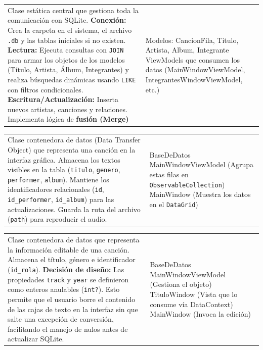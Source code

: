 \documentclass{article}
\newcommand{\tarjeta}[3]{%
      \begin{center}
      \begin{tabular}{|>{\raggedright\arraybackslash}p{7.8cm}|>{\raggedright\arraybackslash}p{4.2cm}|}
        \hline
        \multicolumn{2}{|c|}{#1} \\ \hline
        #2 & #3 \\ \hline
      \end{tabular}
      \end{center}
    }
\begin{document}
\tarjeta{BaseDatos}
{Clase estática central que gestiona toda la comunicación con SQLite.\newline
\textbf{Conexión:} Crea la carpeta en el sistema, el archivo \texttt{.db} y las tablas iniciales si no existen.\newline
\textbf{Lectura:} Ejecuta consultas con \texttt{JOIN} para armar los objetos de los modelos (Título, Artista, Álbum, Integrantes) y realiza búsquedas dinámicas usando \texttt{LIKE} con filtros condicionales.\newline
\textbf{Escritura/Actualización:} Inserta nuevos artistas, canciones y relaciones. Implementa lógica de \textbf{fusión (Merge)}
}
{Modelos: CancionFila, Titulo, Artista, Album, Integrante\newline
ViewModels que consumen los datos (MainWindowViewModel, IntegrantesWindowViewModel, etc.)
}


\tarjeta{CancionFila (Modelo de Datos / DTO)}
{Clase contenedora de datos (Data Transfer Object) que representa una canción en la interfaz gráfica.\newline
Almacena los textos visibles en la tabla (\texttt{titulo}, \texttt{genero}, \texttt{performer}, \texttt{album}).\newline
Mantiene los identificadores relacionales (\texttt{id}, \texttt{id\_performer}, \texttt{id\_album}) para las actualizaciones.\newline
Guarda la ruta del archivo (\texttt{path}) para reproducir el audio.
}
{BaseDeDatos\newline
MainWindowViewModel (Agrupa estas filas en \texttt{ObservableCollection})\newline
MainWindow (Muestra los datos en el \texttt{DataGrid})
}

\tarjeta{Titulo (Modelo de Datos / DTO)}
{Clase contenedora de datos que representa la información editable de una canción.\newline
Almacena el título, género e identificador (\texttt{id\_rola}).\newline
\textbf{Decisión de diseño:} Las propiedades \texttt{track} y \texttt{year} se definieron como enteros anulables (\texttt{int?}). Esto permite que el usuario borre el contenido de las cajas de texto en la interfaz sin que salte una excepción de conversión, facilitando el manejo de nulos antes de actualizar SQLite.
}
{BaseDeDatos\newline
MainWindowViewModel (Gestiona el objeto)\newline
TituloWindow (Vista que lo consume vía DataContext)\newline
MainWindow (Invoca la edición)
}
\end{document}
